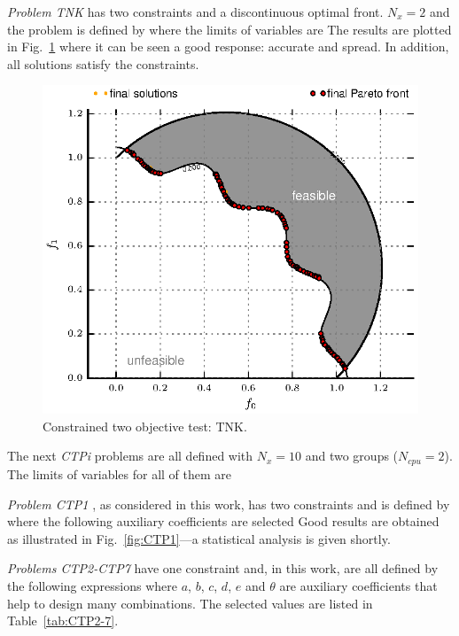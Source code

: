 \documentclass[final,5p,times,twocolumn]{elsarticle}
\newcommand{\figname} {Fig.}
\begin{document}
\emph{Problem TNK} \citep{tanaka:95} has two constraints and a discontinuous optimal front. $N_x=2$
and the problem is defined by
\TNK
where the limits of variables are
\TNKx
The results are plotted in \figname~\ref{fig:TNK} where it can be seen a good
response: accurate and spread. In addition, all solutions satisfy the constraints. 


\begin{figure} \centering
\includegraphics[width=\linewidth]{./figs/res/TNK.eps}
\caption{Constrained two objective test: TNK.}
\label{fig:TNK}
\end{figure}


The next \emph{CTPi} problems are all defined with $N_x=10$ and two groups ($N_{cpu}=2$). The limits
of variables for all of them are
\CTPx


\emph{Problem CTP1} \citep{deb:01a}, as considered in this work, has two constraints and is defined
by
\CTPone
where the following auxiliary coefficients are selected
\CTPoneC
Good results are obtained as illustrated in \figname~\ref{fig:CTP1}---a statistical analysis is
given shortly.


\emph{Problems CTP2-CTP7} \citep{deb:01a} have one constraint and, in this work, are all defined by
the following expressions
\CTPi
where $a$, $b$, $c$, $d$, $e$ and $\theta$ are auxiliary coefficients that help to design many
combinations. The selected values are listed in Table~\ref{tab:CTP2-7}.


\CTPtwoSeven
\end{document}
